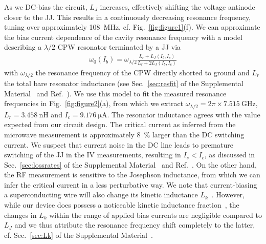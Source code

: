 % 
As we DC-bias the circuit, $L_J$ increases, effectively shifting the voltage antinode closer to the JJ.
% 
This results in a continuously decreasing resonance frequency, tuning over approximately \SI{108}{\mega\hertz}, cf. Fig.~\ref{fig:figure1}(f).
% 
We can approximate the bias current dependence of the cavity resonance frequency with a model describing a $\lambda/2$ CPW resonator terminated by a JJ via
% 
\begin{align}
\omega_0(I_b)=\omega_{\lambda/2}\frac{L_r+L_J(I_b,I_c)}{L_r + 2L_J(I_b,I_c)}
\label{eq:f0vsI}
\end{align}
% 
with $\omega_{\lambda/2}$ the resonance frequency of the CPW directly shorted to ground and $L_r$ the total bare resonator inductance  (see Sec.~\ref{sec:resfit} of the Supplemental Material~\cite{SeeSupplementalMaterial} and Ref.~\cite{pogorzalekHystereticFluxResponse2017}).
% 
We use this model to fit the measured resonance frequencies in Fig.~\ref{fig:figure2}(a), from which we extract $\omega_{\lambda/2}=2\pi\times\SI{7.515}{\giga\hertz}$, $L_r=\SI{3.458}{\nano\henry}$ and $I_c=\SI{9.176}{\micro\ampere}$.
% 
The resonator inductance agrees with the value expected from our circuit design.
% 
The critical current as inferred from the microwave measurement is approximately \SI{8}{\percent} larger than the DC switching current.
% 
We suspect that current noise in the DC line leads to premature switching of the JJ in the IV measurements, resulting in $I_s<I_c$, as discussed in Sec.~\ref{sec:lossrates} of the Supplemental Material~\cite{SeeSupplementalMaterial} and Ref.~\cite{kautzNoiseaffectedIVCurves1990}.
% 
On the other hand, the RF measurement is sensitive to the Josephson inductance, from which we can infer the critical current in a less perturbative way.
% 
We note that current-biasing a superconducting wire will also change its kinetic inductance $L_k$~\cite{annunziataTunableSuperconductingNanoinductors2010b,vissersFrequencytunableSuperconductingResonators2015b}.
% 
However, while our device does possess a noticeable kinetic inductance fraction~\cite{gaoExperimentalStudyKinetic2006}, the changes in $L_k$ within the range of applied bias currents are negligible compared to $L_J$ and we thus attribute the resonance frequency shift completely to the latter, cf. Sec.~\ref{sec:Lk} of the Supplemental Material~\cite{SeeSupplementalMaterial}.



